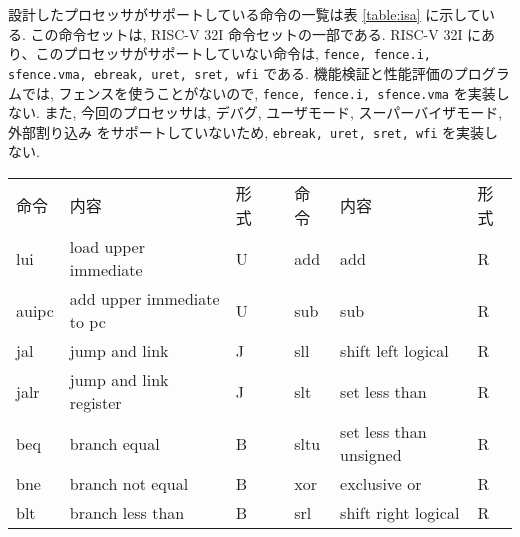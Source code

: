 \documentclass[../specifications.tex]{subfiles}
\begin{document}
  設計したプロセッサがサポートしている命令の一覧は表 \ref{table:isa} に示している.
  この命令セットは, RISC-V 32I 命令セットの一部である.
  RISC-V 32I にあり、このプロセッサがサポートしていない命令は, 
  \verb|fence, fence.i, sfence.vma, ebreak, uret, sret, wfi| である.
  機能検証と性能評価のプログラムでは, フェンスを使うことがないので, 
  \verb|fence, fence.i, sfence.vma| を実装しない.
  また, 今回のプロセッサは, デバグ, ユーザモード, スーパーバイザモード, 外部割り込み
  をサポートしていないため, \verb|ebreak, uret, sret, wfi| を実装しない.

  \begin{table}[h]
    \begin{tabular}{|l|l|l|llll}
    \cline{1-3} \cline{5-7}
    命令    & 内容                                    & 形式 & \multicolumn{1}{l|}{} & \multicolumn{1}{l|}{命令}     & \multicolumn{1}{l|}{内容}                            & \multicolumn{1}{l|}{形式} \\ \cline{1-3} \cline{5-7}
    lui   & load upper immediate                  & U  & \multicolumn{1}{l|}{} & \multicolumn{1}{l|}{add}    & \multicolumn{1}{l|}{add}                           & \multicolumn{1}{l|}{R}  \\
    auipc & add upper immediate to pc             & U  & \multicolumn{1}{l|}{} & \multicolumn{1}{l|}{sub}    & \multicolumn{1}{l|}{sub}                           & \multicolumn{1}{l|}{R}  \\
    jal   & jump and link                         & J  & \multicolumn{1}{l|}{} & \multicolumn{1}{l|}{sll}    & \multicolumn{1}{l|}{shift left logical}            & \multicolumn{1}{l|}{R}  \\
    jalr  & jump and link register                & J  & \multicolumn{1}{l|}{} & \multicolumn{1}{l|}{slt}    & \multicolumn{1}{l|}{set less than}                 & \multicolumn{1}{l|}{R}  \\
    beq   & branch equal                          & B  & \multicolumn{1}{l|}{} & \multicolumn{1}{l|}{sltu}   & \multicolumn{1}{l|}{set less than unsigned}        & \multicolumn{1}{l|}{R}  \\
    bne   & branch not equal                      & B  & \multicolumn{1}{l|}{} & \multicolumn{1}{l|}{xor}    & \multicolumn{1}{l|}{exclusive or}                  & \multicolumn{1}{l|}{R}  \\
    blt   & branch less than                      & B  & \multicolumn{1}{l|}{} & \multicolumn{1}{l|}{srl}    & \multicolumn{1}{l|}{shift right logical}           & \multicolumn{1}{l|}{R}  \\

\end{tabular}
\end{table}
\end{document}
